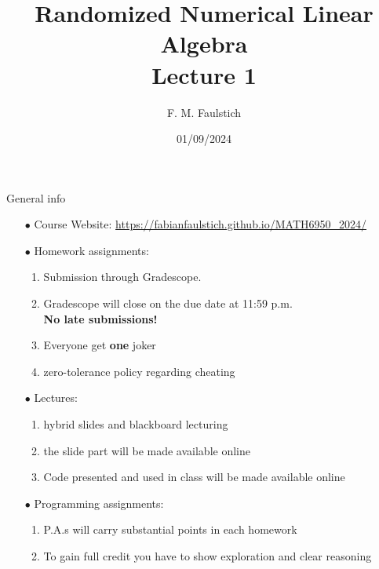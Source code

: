 \documentclass{beamer}
\title{
Randomized Numerical Linear Algebra\\
Lecture 1
}
\author{F. M. Faulstich}
\date{01/09/2024}
\begin{document}
\frame{\titlepage}

\begin{frame}{General info}

\begin{itemize}
    \item[$\bullet$] Course Website: \href{https://fabianfaulstich.github.io/MATH6950_2024/}{https://fabianfaulstich.github.io/MATH6950\_2024/}
    \item[$\bullet$] Homework assignments: 
    \begin{enumerate}
        \item Submission through Gradescope. 
        \item Gradescope will close on the due date at 11:59 p.m.\\
        {\bf No late submissions!}
        \item Everyone get {\bf one} joker
        \item  zero-tolerance policy regarding cheating
    \end{enumerate}
    \item[$\bullet$] Lectures:
        \begin{enumerate}
            \item hybrid slides and blackboard lecturing
            \item the slide part will be made available online
            \item Code presented and used in class will be made available online
        \end{enumerate}
    \item[$\bullet$] Programming assignments:
    \begin{enumerate}
        \item P.A.s will carry substantial points in each homework
        \item To gain full credit you have to show exploration and clear reasoning 
    \end{enumerate}
\end{itemize}

\end{frame}
\end{document}
